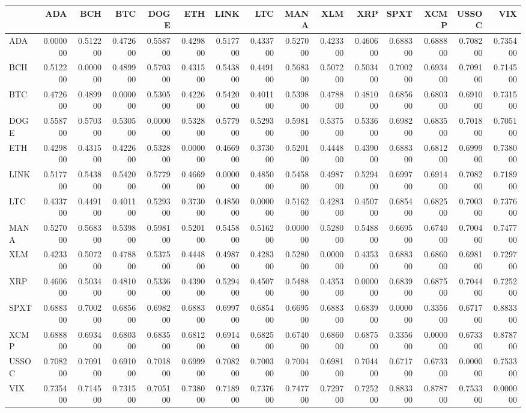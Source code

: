 \begin{tabular}{lrrrrrrrrrrrrrr}
\toprule
 & ADA & BCH & BTC & DOGE & ETH & LINK & LTC & MANA & XLM & XRP & SPXT & XCMP & USSOC & VIX \\
\midrule
ADA & 0.000000 & 0.512200 & 0.472600 & 0.558700 & 0.429800 & 0.517700 & 0.433700 & 0.527000 & 0.423300 & 0.460600 & 0.688300 & 0.688800 & 0.708200 & 0.735400 \\
BCH & 0.512200 & 0.000000 & 0.489900 & 0.570300 & 0.431500 & 0.543800 & 0.449100 & 0.568300 & 0.507200 & 0.503400 & 0.700200 & 0.693400 & 0.709100 & 0.714500 \\
BTC & 0.472600 & 0.489900 & 0.000000 & 0.530500 & 0.422600 & 0.542000 & 0.401100 & 0.539800 & 0.478800 & 0.481000 & 0.685600 & 0.680300 & 0.691000 & 0.731500 \\
DOGE & 0.558700 & 0.570300 & 0.530500 & 0.000000 & 0.532800 & 0.577900 & 0.529300 & 0.598100 & 0.537500 & 0.533600 & 0.698200 & 0.683500 & 0.701800 & 0.705100 \\
ETH & 0.429800 & 0.431500 & 0.422600 & 0.532800 & 0.000000 & 0.466900 & 0.373000 & 0.520100 & 0.444800 & 0.439000 & 0.688300 & 0.681200 & 0.699900 & 0.738000 \\
LINK & 0.517700 & 0.543800 & 0.542000 & 0.577900 & 0.466900 & 0.000000 & 0.485000 & 0.545800 & 0.498700 & 0.529400 & 0.699700 & 0.691400 & 0.708200 & 0.718900 \\
LTC & 0.433700 & 0.449100 & 0.401100 & 0.529300 & 0.373000 & 0.485000 & 0.000000 & 0.516200 & 0.428300 & 0.450700 & 0.685400 & 0.682500 & 0.700300 & 0.737600 \\
MANA & 0.527000 & 0.568300 & 0.539800 & 0.598100 & 0.520100 & 0.545800 & 0.516200 & 0.000000 & 0.528000 & 0.548800 & 0.669500 & 0.674000 & 0.700400 & 0.747700 \\
XLM & 0.423300 & 0.507200 & 0.478800 & 0.537500 & 0.444800 & 0.498700 & 0.428300 & 0.528000 & 0.000000 & 0.435300 & 0.688300 & 0.686000 & 0.698100 & 0.729700 \\
XRP & 0.460600 & 0.503400 & 0.481000 & 0.533600 & 0.439000 & 0.529400 & 0.450700 & 0.548800 & 0.435300 & 0.000000 & 0.683900 & 0.687500 & 0.704400 & 0.725200 \\
SPXT & 0.688300 & 0.700200 & 0.685600 & 0.698200 & 0.688300 & 0.699700 & 0.685400 & 0.669500 & 0.688300 & 0.683900 & 0.000000 & 0.335600 & 0.671700 & 0.883300 \\
XCMP & 0.688800 & 0.693400 & 0.680300 & 0.683500 & 0.681200 & 0.691400 & 0.682500 & 0.674000 & 0.686000 & 0.687500 & 0.335600 & 0.000000 & 0.673300 & 0.878700 \\
USSOC & 0.708200 & 0.709100 & 0.691000 & 0.701800 & 0.699900 & 0.708200 & 0.700300 & 0.700400 & 0.698100 & 0.704400 & 0.671700 & 0.673300 & 0.000000 & 0.753300 \\
VIX & 0.735400 & 0.714500 & 0.731500 & 0.705100 & 0.738000 & 0.718900 & 0.737600 & 0.747700 & 0.729700 & 0.725200 & 0.883300 & 0.878700 & 0.753300 & 0.000000 \\
\bottomrule
\end{tabular}
